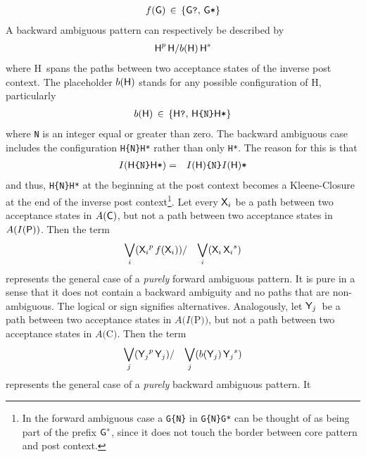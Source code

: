 \documentclass[acmtoplas]{acmtrans2m}
\newcommand{\fa}[1]{$A(${\sf #1}$)$}
\newcommand{\finv}[1]{$I(${\sf #1}$)$}
\newcommand{\pG}{{\sf G}}
\newcommand{\pH}{{\sf H}}
\newcommand{\pXi}{$\mbox{\sf X}_i$}
\newcommand{\pYj}{$\mbox{\sf Y}_j$}
\newcommand{\mpP}{\mbox{\sf P}}
\newcommand{\mpC}{\mbox{\sf C}}
\newcommand{\mpG}{\mbox{\sf G}}
\newcommand{\mpH}{\mbox{\sf H}}
\newcommand{\mpX}{\mbox{\sf X}}
\newcommand{\corepattern}[1] {\mbox{\sf #1}^p  \,  \mbox{\sf #1}}
\newcommand{\corepatternf}[1]{\mbox{\sf #1}^p  \,f(\mbox{\sf #1})}
\newcommand{\postcontext}[1] {\mbox{\sf #1}    \,  \mbox{\sf #1}^s}
\newcommand{\postcontextb}[1]{b(\mbox{\sf #1}) \,  \mbox{\sf #1}^s}
\begin{document}
\begin{eqnarray}
    f(\mpG) \,\in\, \left \{ \mbox{\pG\tt ?},\, \mbox{\pG \tt *} \right \}             
\end{eqnarray}
A backward ambiguous pattern can respectively be described by 
\begin{eqnarray}
           \corepattern{H} / \postcontextb{H} 
\end{eqnarray}
where \pH\ spans the paths between two acceptance states of the inverse post context. 
The placeholder $b(\mpH)$ stands for any possible configuration of \pH, particularly
\begin{eqnarray}
b(\mpH) \,\in\, \left \{ \mbox{\pH\tt ?},\, \mbox{\pH\tt\{N\}\mpH*} \right \}             
\end{eqnarray}
where {\tt N} is an integer equal or greater than zero.
The backward ambiguous case includes the configuration {\tt \pH\{N\}\pH*} rather than 
only {\tt \pH*}. The reason for this is that
\begin{eqnarray}
     I(\mbox{\pH\tt \{N\}\pH*} ) 
& = & 
     I(\mpH)\mbox{\tt\{N\}}I(\mpH)\mbox{\tt *}
\end{eqnarray}
and thus, {\tt \pH\{N\}\pH*} at the beginning at the post context
becomes a Kleene-Closure at the end of the inverse post context\footnote{
    In the forward ambiguous case a {\tt \pG\{N\}} in {\tt \pG\{N\}\pG*}
   can be thought of as being part of the prefix $\mpG^s$, since it does not
      touch the border between core pattern and post context.}.
Let every $\mpX_i$ be a path between two acceptance states in $A(\mpC)$, but
not a path between two acceptance states in $A(I(\mpP))$. Then the 
term
\begin{eqnarray} \label{eq:fa-pattern}
            \bigvee_i( \corepatternf{\pXi} ) & / & \bigvee_i( \postcontext{\pXi} )
\end{eqnarray}
represents the general case of a {\it purely} forward ambiguous 
pattern. It is pure in a sense that it does not contain a backward ambiguity and
no paths that are non-ambiguous. The logical or sign signifies alternatives. 
Analogously, let \pYj\ be a path between two acceptance states in \fa{\finv{P}}, but
not a path between two acceptance states in \fa{C}. Then the 
term
\begin{eqnarray} \label{eq:ba-pattern}
            \bigvee_j( \corepattern{\pYj} ) & / & \bigvee_j( \postcontextb{\pYj} )
\end{eqnarray}
represents the general case of a {\it purely} backward ambiguous pattern. It
\end{document}
